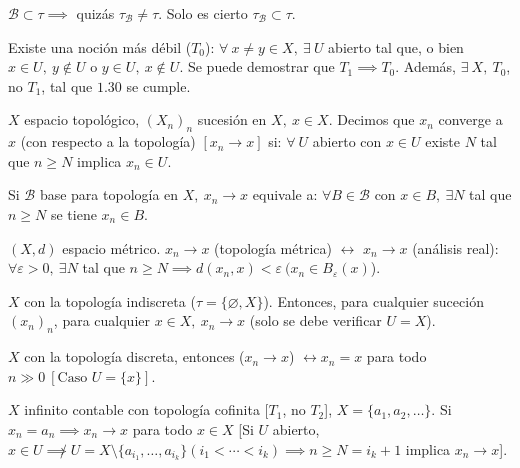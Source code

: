 
\begin{remark}
	$\mathcal{B} \subset \tau \implies$ quizás $\tau_{\mathcal{B}} \neq \tau$. Solo es cierto $\tau_{\mathcal{B}} \subset \tau$.
\end{remark}

\begin{remark}
	Existe una noción más débil ($T_0$): $\forall \ x \neq y \in X,\ \exists \ U$ abierto tal que, o bien $x \in U,\ y \not\in U$ o $y \in U,\ x \not\in U$. Se puede demostrar que $T_1 \implies T_0$. Además, $\exists\ X,\ T_0$, no $T_1$, tal que $1.30$ se cumple.
\end{remark}

\begin{definition}
	$X$ espacio topológico, $(X_n)_n$ sucesión en $X,\ x \in X$. Decimos que $x_n$ converge a $x$ (con respecto a la topología) $[x_n \to x]$ si: $\forall \ U$ abierto con $x\in U$ existe $N$ tal que $n\geq N$ implica $x_n \in U$.
\end{definition}

\begin{note}
	Si $\mathcal{B}$ base para topología en $X,\ x_n \to x$ equivale a: $\forall B \in \mathcal{B}$ con $x \in B, \ \exists N$ tal que $n\geq N$ se tiene $x_n \in B$.
\end{note}

\begin{eg}
	$(X,d)$ espacio métrico. $x_n \to x$ (topología métrica) $\longleftrightarrow$ $x_n \to x$ (análisis real): $\forall \varepsilon > 0,\ \exists N$ tal que $n \geq N \implies d(x_n,x)<\varepsilon \ (x_n \in B_{\varepsilon} (x)$). 
\end{eg}

\begin{eg}
	$X$ con la topología indiscreta ($\tau = \{\varnothing, X\}$). Entonces, para cualquier suceción $(x_n)_n$, para cualquier $x \in X, \ x_n \to x$ (solo se debe verificar $U = X$).  
\end{eg}

\begin{eg}
	$X$ con la topología discreta, entonces ($x_n \to x$) $\longleftrightarrow x_n = x$ para todo $n\gg 0 \ [\text{Caso } U=\{x\}]$. 
\end{eg}

\begin{eg}
	$X$ infinito contable con topología cofinita [$T_1$, no $T_2$], $X = \{ a_1, a_2, \dots \}$. Si $x_n = a_n \implies x_n \to x$ para todo $x \in X$ [Si $U$ abierto, $x \in U \not\implies U = X \setminus \{a_{i_1},\dots, a_{i_k} \} (i_1<\cdots<i_k) \implies n \geq N = i_k + 1$ implica $x_n \to x$].   
\end{eg}

